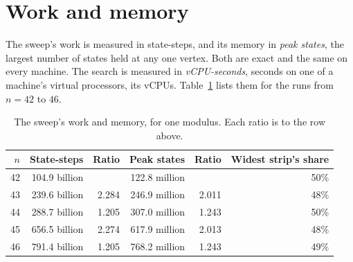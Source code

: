 \documentclass[11pt]{a000104}
\numberwithin{equation}{section}
\begin{document}
\section{Work and memory}\label{sec:growth}

The sweep's work is measured in state-steps, and its memory in \emph{peak states}, the largest number of states held at any one vertex.
Both are exact and the same on every machine.
The search is measured in \emph{vCPU-seconds}, seconds on one of a machine's virtual processors, its vCPUs.
Table~\ref{tab:growth} lists them for the runs from $n = 42$ to $46$.

\begin{table}[!htbp]
  \centering
  \begin{tabular}{rrrrrr}
    \toprule
    $n$ & State-steps & Ratio & Peak states & Ratio & Widest strip's share \\
    \midrule
    42 & 104.9 billion & & 122.8 million & & 50\% \\
    43 & 239.6 billion & 2.284 & 246.9 million & 2.011 & 48\% \\
    44 & 288.7 billion & 1.205 & 307.0 million & 1.243 & 50\% \\
    45 & 656.5 billion & 2.274 & 617.9 million & 2.013 & 48\% \\
    46 & 791.4 billion & 1.205 & 768.2 million & 1.243 & 49\% \\
    \bottomrule
  \end{tabular}
  \caption{The sweep's work and memory, for one modulus. Each ratio is to the row above.}
  \label{tab:growth}
\end{table}
\end{document}
